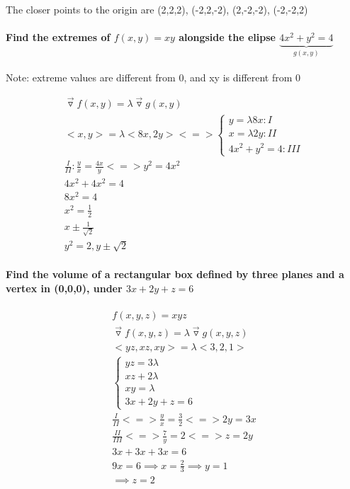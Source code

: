 \documentclass[11pt,fleqn]{book} %
\begin{document}
The closer points to the origin are (2,2,2), (-2,2,-2), (2,-2,-2), (-2,-2,2)

\paragraph{Find the extremes of $f(x,y) = xy$ alongside the elipse
$\underbrace{4x^2+y^2=4}_{g(x,y)}$}
Note: extreme values are different from 0, and xy is different from 0

\begin{gather}
    \vec{ \triangledown } f(x,y) = \lambda \vec{\triangledown} g(x,y)\\
    <x,y> = \lambda <8x,2y> <=> \begin{cases}
        y = \lambda 8x: I \\
        x = \lambda 2y: II \\
        4x^2 + y^2 = 4: III
    \end{cases} \\
    \frac{I}{II}: \frac{y}{x} = \frac{4x}{y} <=> y^2 = 4x^2 \\
    4x^2 + 4x^2 = 4 \\
    8x^2 = 4 \\
    x^2 = \frac{1}{2} \\
    x \pm \frac{1}{\sqrt{2}} \\
    y^2 = 2, y \pm \sqrt{2}
\end{gather}

\paragraph{Find the volume of a rectangular box defined by three planes and a vertex in (0,0,0),
under $3x + 2y + z = 6$}

\begin{gather}
    f(x,y,z) = xyz \\
    \vec{\triangledown}f(x,y,z) = \lambda \vec{\triangledown} g (x,y,z) \\
    <yz,xz,xy> = \lambda <3,2,1> \\
    \begin{cases}
        yz = 3 \lambda \\
        xz + 2 \lambda \\
        xy = \lambda \\
        3x + 2y + z = 6
    \end{cases}\\
    \frac{I}{II} <=> \frac{y}{x} = \frac{3}{2} <=> 2y = 3x \\
    \frac{II}{III} <=> \frac{7}{y} = 2 <=> z = 2y\\
    3x+3x+3x=6\\
    9x=6 \implies x = \frac{2}{3} \implies y = 1 \\
    \implies z = 2
\end{gather}
\end{document}
